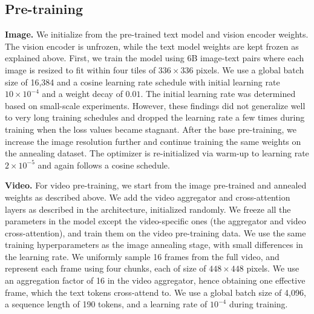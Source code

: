 \subsection{Pre-training}
\label{section:vision_training_recipe}

\textbf{Image.}
We initialize from the pre-trained text model and vision encoder weights.
The vision encoder is unfrozen, while the text model weights are kept frozen as explained above.
First, we train the model using 6B image-text pairs where each image is resized to fit within four tiles of $336 \times 336$ pixels.
We use a global batch size of 16,384 and a cosine learning rate schedule with initial learning rate $10 \times 10^{-4}$ and a weight decay of $0.01$.
The initial learning rate was determined based on small-scale experiments.
However,  these findings did not generalize well to very long training schedules and dropped the learning rate a few times during training when the loss values became stagnant.
After the base pre-training, we increase the image resolution further and continue training the same weights on the annealing dataset.
The optimizer is re-initialized via warm-up to learning rate $2 \times 10^{-5}$ and again follows a cosine schedule.

\textbf{Video.}
For video pre-training, we start from the image pre-trained and annealed weights as described above.
We add the video aggregator and cross-attention layers as described in the architecture, initialized randomly. We freeze all the parameters in the model except the video-specific ones (the aggregator and video cross-attention), and train them on the video pre-training data.
We use the same training hyperparameters as the image annealing stage, with small differences in the learning rate.
We uniformly sample 16 frames from the full video, and represent each frame using four chunks, each of size of $448 \times 448$ pixels.
We use an aggregation factor of 16 in the video aggregator, hence obtaining one effective frame, which the text tokens cross-attend to.
We use a global batch size of 4,096, a sequence length of 190 tokens, and a learning rate of $10^{-4}$ during training.
